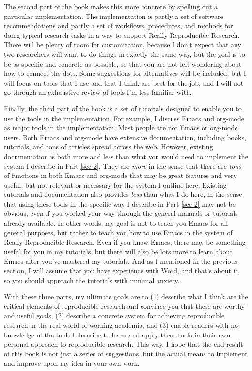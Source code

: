 \documentclass[11pt]{book}
\begin{document}
The second part of the book makes this more concrete by spelling out a particular implementation.  The implementation is partly a set of software recommendations and partly a set of workflows, procedures, and methods for doing typical research tasks in a way to support Really Reproducible Research.  There will be plenty of room for customization, because I don't expect that any two researchers will want to do things in exactly the same way, but the goal is to be as specific and concrete as possible, so that you are not left wondering about how to connect the dots.  Some suggestions for alternatives will be included, but I will focus on tools that I use and that I think are best for the job, and I will not go through an exhaustive review of tools I'm less familiar with.

Finally, the third part of the book is a set of tutorials designed to enable you to use the tools in the implementation.  For example, I discuss Emacs and org-mode as major tools in the implementation.  Most people are not Emacs or org-mode users.  Both Emacs and org-mode have extensive documentation, including books, tutorials, and tons of articles spread across the web.  However, existing documentation is both more and less than what you would need to implement the system I describe in Part \ref{sec-2}. They are \emph{more} in the sense that there are \emph{tons} of functions in both Emacs and org-mode that may be great features and very useful, but not relevant or necessary for the system I outline here.  Existing tutorials and documentation also provides \emph{less} than what I do here, in the sense that using these tools in the specific way I describe in Part \ref{sec-2} may not be obvious, even if you worked your way through the general manuals or tutorials already available.  In other words, my goal is not to teach you Emacs for all general purposes, but rather to teach you how to use Emacs in the system of Really Reproducible Research.  Even if you know Emacs, there may be something useful for you in my tutorials, but there will also be lots more to learn about Emacs after you've mastered my tutorials. And as I mentioned in the previous section, I will assume that you have experience with Word, and that's about it, so you should approach the tutorials with minimal anxiety.

With these three parts, my ultimate goals are to (1) describe what I think are the critical elements of reproducible research and convince you that these are worthy and useful goals, (2) describe a concrete system for achieving reproducible research in the real world of working academia, and (3) enable readers with no knowledge of the tools I describe to learn and apply these tools in their own personal approach to reproducible research. This way, I hope that the end result of this book is not just a series of suggestions, but the actual means to implement and improve upon my idea in your own work.
\end{document}

